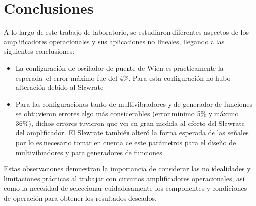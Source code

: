 \section{Conclusiones}

A lo largo de este trabajo de laboratorio, se estudiaron diferentes aspectos de los amplificadores operacionales y sus aplicaciones no lineales, llegando a las siguientes conclusiones:

\begin{itemize}
    \item La configuración de oscilador de puente de Wien es practicamente la esperada, el error máximo fue del 4\%. Para esta configuración no hubo alteración debido al Slewrate
    
    \item Para las configuraciones tanto de multivibradores y de generador de funciones se obtuvieron errores algo más considerables (error mínimo 5\% y máximo 36\%), dichos errores tuvieron que ver en gran medida al efecto del Slewrate del amplificador. El Slewrate también alteró la forma esperada de las señales por lo es necesario tomar en cuenta de este parámetros para el diseño de multivibradores y para generadores de funciones.

\end{itemize}

Estas observaciones demuestran la importancia de considerar las no idealidades y limitaciones prácticas al trabajar con circuitos amplificadores operacionales, así como la necesidad de seleccionar cuidadosamente los componentes y condiciones de operación para obtener los resultados deseados.